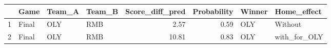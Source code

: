 \begin{table}[ht]
\centering
\begin{tabular}{rlllrrll}
  \hline
 & Game & Team\_A & Team\_B & Score\_diff\_pred & Probability & Winner & Home\_effect \\ 
  \hline
1 & Final & OLY & RMB & 2.57 & 0.59 & OLY & Without \\ 
  2 & Final & OLY & RMB & 10.81 & 0.83 & OLY & with\_for\_OLY \\ 
   \hline
\end{tabular}
\end{table}
